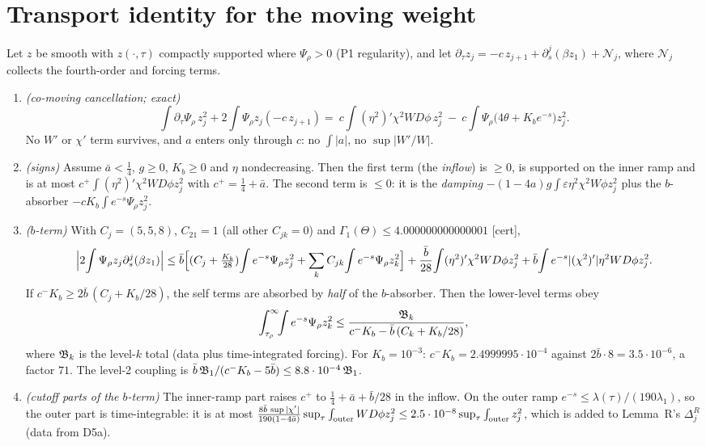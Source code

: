 \documentclass[11pt]{article}
\theoremstyle{remark}\newtheorem{remark}[theorem]{Remark}
\newcommand{\tC}{\textup{[cert]}}\newcommand{\tE}{\textup{[est]}}\newcommand{\tP}{\textup{[paper]}}\newcommand{\tR}{\textup{[rev]}}
\begin{document}
\section{Transport identity for the moving weight}\label{sec:T}
\begin{lemma}\label{lem:T}
Let $z$ be smooth with $z(\cdot,\tau)$ compactly supported where $\Psi_\rho>0$ (P1 regularity), and let $\partial_\tau z_j=-c\,z_{j+1}+\partial_s^j(\beta z_1)+\mathcal N_j$, where $\mathcal N_j$ collects the fourth-order and forcing terms.
\begin{enumerate}[label=(\roman*),leftmargin=*]
\item \emph{(co-moving cancellation; exact)}
\[
\int\partial_\tau\Psi_\rho\,z_j^2+2\int\Psi_\rho z_j(-c\,z_{j+1})
=\ c\!\int(\eta^2)'\chi^2WD\phi\,z_j^2\ -\ c\!\int\Psi_\rho\bigl(4\theta+K_be^{-s}\bigr)z_j^2 .
\]
No $W'$ or $\chi'$ term survives, and $a$ enters only through $c$: no $\int|a|$, no $\sup|W'/W|$.
\item \emph{(signs)} Assume $\bar a<\tfrac14$, $g\ge0$, $K_b\ge0$ and $\eta$ nondecreasing. Then the first term (the \emph{inflow}) is $\ge0$, is supported on the inner ramp and is at most $c^+\!\int(\eta^2)'\chi^2WD\phi z_j^2$ with $c^+=\tfrac14+\bar a$. The second term is $\le0$: it is the \emph{damping} $-(1-4a)g\int\varepsilon\eta^2\chi^2W\phi z_j^2$ plus the $b$-absorber $-cK_b\int e^{-s}\Psi_\rho z_j^2$.
\item \emph{($b$-term)} With $C_j=(5,5,8)$, $C_{21}=1$ (all other $C_{jk}=0$) and $\Gamma_1(\Theta)\le4.000000000000001$ \tC,
\[
\Bigl|2\!\int\Psi_\rho z_j\partial_s^j(\beta z_1)\Bigr|\le\bar b\Bigl[(C_j+\tfrac{K_b}{28})\!\int e^{-s}\Psi_\rho z_j^2+\sum_kC_{jk}\!\int e^{-s}\Psi_\rho z_k^2\Bigr]+\frac{\bar b}{28}\!\int(\eta^2)'\chi^2WD\phi z_j^2+\bar b\!\int e^{-s}|(\chi^2)'|\eta^2WD\phi z_j^2 .
\]
If $c^-K_b\ge2\bar b\,(C_j+K_b/28)$, the self terms are absorbed by \emph{half} of the $b$-absorber. Then the lower-level terms obey
\[
\int_{\tau_\rho}^\infty\!\!\int e^{-s}\Psi_\rho z_k^2\le\frac{\mathfrak B_k}{c^-K_b-\bar b\,(C_k+K_b/28)},
\]
where $\mathfrak B_k$ is the level-$k$ total (data plus time-integrated forcing). For $K_b=10^{-3}$: $c^-K_b=2.4999995\cdot10^{-4}$ against $2\bar b\cdot8=3.5\cdot10^{-6}$, a factor $71$. The level-2 coupling is $\bar b\,\mathfrak B_1/(c^-K_b-5\bar b)\le8.8\cdot10^{-4}\,\mathfrak B_1$.
\item \emph{(cutoff parts of the $b$-term)} The inner-ramp part raises $c^+$ to $\tfrac14+\bar a+\bar b/28$ in the inflow. On the outer ramp $e^{-s}\le\lambda(\tau)/(190\lambda_1)$, so the outer part is time-integrable: it is at most $\frac{8\bar b\,\sup|\chi'|}{190(1-4\bar a)}\sup_\tau\int_{\rm outer}WD\phi z_j^2\le2.5\cdot10^{-8}\sup_\tau\int_{\rm outer}z_j^2$, which is added to Lemma~R's $\Delta^R_j$ (data from D5a).
\end{enumerate}
\end{lemma}
\end{document}

